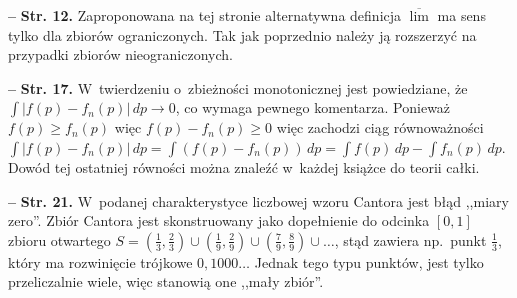 \documentclass[a4paper,11pt]{article}
\newcommand{\tb}{\textbf}
\newcommand{\dA}[1]{\, d#1}
\newcommand{\Str}[1]{\textbf{Str. #1.}}
\begin{document}
\tb{--} \Str{12} Zaproponowana na tej stronie alternatywna definicja
$\overline{\lim}$ ma sens tylko dla zbiorów ograniczonych. Tak jak
poprzednio należy ją rozszerzyć na przypadki zbiorów nieograniczonych.

\tb{--} \Str{17} W~twierdzeniu o~zbieżności monotonicznej jest
powiedziane,
że~$\int | f( p ) - f_{ n }( p ) | \dA{ p } \rightarrow 0$, co wymaga
pewnego komentarza. Ponieważ $f( p ) \geq f_{ n }( p )$ więc
$f( p ) - f_{ n }( p ) \geq 0$ więc zachodzi ciąg równoważności
$\int | f( p ) - f_{ n }( p ) | \dA{ p } = \int ( f( p ) - f_{ n }( p
) ) \dA{ p } = \int f( p ) \dA{ p } - \int f_{ n }( p ) \dA{ p }$.
Dowód tej ostatniej równości można znaleźć w~każdej książce do teorii
całki.

\tb{--} \Str{21} W~podanej charakterystyce liczbowej wzoru Cantora
jest błąd ,,miary zero''. Zbiór Cantora jest skonstruowany jako
dopełnienie do odcinka $[ 0, 1 ]$ zbioru otwartego
$S = \left( \frac{ 1 }{ 3 }, \frac{ 2 }{ 3 } \right) \cup \left(
  \frac{ 1 }{ 9 }, \frac{ 2 }{ 9 } \right) \cup \left( \frac{ 7 }{ 9
  }, \frac{ 8 }{ 9 } \right) \cup \ldots$, stąd zawiera np.~punkt
$\tfrac{ 1 }{ 3 }$, który ma rozwinięcie trójkowe $0,1000\ldots$
Jednak tego typu punktów, jest tylko przeliczalnie wiele, więc
stanowią one ,,mały zbiór''.
\end{document}
